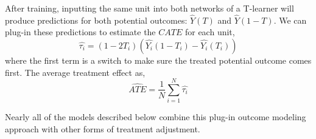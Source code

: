 After training, inputting the same unit into both networks of a T-learner will produce predictions for both potential outcomes: $\hat{Y}(T)$ and $\hat{Y}(1-T)$. We can plug-in these predictions to estimate the $CATE$ for each unit, 
$$\hat{\tau_i}=(1-2T_i)(\hat{Y_i}(1-T_i)-\hat{Y_i}(T_i))$$
where the first term is a switch to make sure the treated potential outcome comes first. The average treatment effect as,
$$\widehat{ATE}=\frac{1}{N}\sum_{i=1}^N\hat{\tau_i}$$

Nearly all of the models described below combine this plug-in outcome modeling approach with other forms of treatment adjustment.